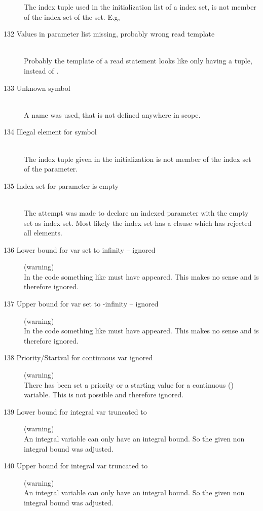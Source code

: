 \begin{description}
   The index tuple used in the initialization list of a index set, is
   not member of the index set of the set.
   E.g, 
\item[132 Values in parameter list missing, probably wrong read
  template]\ \\
  Probably the template of a read statement looks
  like  only having a tuple, instead of .
\item[133 Unknown symbol \code{xxx}]\ \\
  A name was used, that is not defined anywhere in scope.
\item[134 Illegal element \code{xxx} for symbol]\ \\
  The index tuple given in the initialization is not member of the
  index set of the parameter.
\item[135 Index set for parameter \code{xxx} is empty]\ \\
  The attempt was made to declare an indexed parameter with the
  empty set as index set. Most likely the index set has a 
  clause which has rejected all elements.
\item[136 Lower bound for var \code{xxx} set to infinity -- ignored] (warning)\ \\
  In the \zimpl code something like  must have
  appeared. This makes no sense and is therefore ignored.
\item[137 Upper bound for var \code{xxx} set to -infinity -- ignored] (warning)\ \\
  In the \zimpl code something like  must have 
  appeared. This makes no sense and is therefore ignored.
\item[138 Priority/Startval for continuous var \code{xxx} ignored] (warning)\ \\
  There has been set a priority or a starting value for a continuous 
  () variable. This is not possible and therefore ignored.
\item[139 Lower bound for integral var \code{xxx} truncated to
  \code{yyy}] (warning)\ \\
  An integral variable can only have an integral bound. So the given
  non integral bound was adjusted.
\item[140 Upper bound for integral var \code{xxx} truncated to
  \code{yyy}] (warning)\ \\
  An integral variable can only have an integral bound. So the given
  non integral bound was adjusted.

\end{description}
